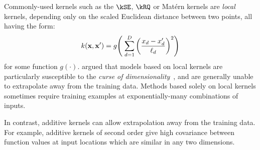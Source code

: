 Commonly-used kernels such as the $\kSE$, $\kRQ$ or Mat\'{e}rn kernels are \emph{local} kernels, depending only on the scaled Euclidean distance between two points, all having the form:
\begin{align}
k({\bf x, x'}) = g \!\left( \; \sum_{d=1}^D \left( \frac{  x_{d} - x_{d}' }{ \ell_d } \right)^2 \right)
\end{align}
for some function $g(\cdot)$.
\citet{bengio2006curse} argued that models based on local kernels are particularly susceptible to the \emph{curse of dimensionality}~\citep{bellman1956dynamic}, and are generally unable to extrapolate away from the training data.
Methods based solely on local kernels sometimes require training examples at exponentially-many combinations of inputs.

In contrast, additive kernels can allow extrapolation away from the training data.
For example, additive kernels of second order give high covariance between function values at input locations which are similar in any two dimensions.

